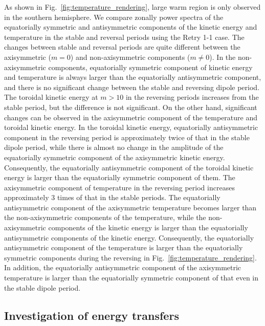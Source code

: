 As shown in Fig.~\ref{fig:temperature_rendering}, large warm region is only observed in the southern hemisphere. 
We compare zonally power spectra of the equatorially symmetric and antisymmetric components of the kinetic energy and temperature in the stable and reversal periods using the Retry 1-1 case. 
The changes between stable and reversal periods are quite different between the axisymmetric ($m = 0$) and non-axisymmetric components ($m \ne 0$). 
In the non-axisymmetric components, equatorially symmetric component of kinetic energy and temperature is always larger than the equatorially antisymmetric component, and there is no significant change between the stable and reversing dipole period. 
The toroidal kinetic energy at $m > 10$ in the reversing periods increases from the stable period, but the difference is not significant. 
On the other hand, significant changes can be observed in the axisymmetric component of the temperature and toroidal kinetic energy. 
In the toroidal kinetic energy, equatorially antisymmetric component in the reversing period is approximately twice of that in the stable dipole period, while there is almost no change in the amplitude of the equatorially symmetric component of the axisymmetric kinetic energy.
Consequently, the equatorially antisymmetric component of the toroidal kinetic energy is larger than the equatorially symmetric component of them. 
The axisymmetric component of temperature in the reversing period increases approximately 3 times of that in the stable periods. 
The equatorially antisymmetric component of the axisymmetric temperature becomes larger than the non-axisymmetric components of the temperature, while the non-axisymmetric components of the kinetic energy is larger than the equatorially antisymmetric components of the kinetic energy. 
Consequently, the equatorially antisymmetric component of the temperature is larger than the equatorially symmetric components during the reversing in Fig.~\ref{fig:temperature_rendering}. 
In addition, the equatorially antisymmetric component of the axisymmetric temperature is larger than the equatorially symmetric component of that even in the stable dipole period.

{\color{red}
\subsection{Investigation of energy transfers}
}

